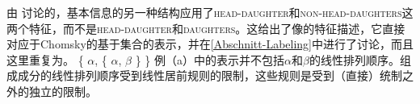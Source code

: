 \noindent
由 \citet[\S~9]{ps2}讨论的，基本信息的另一种结构应用了\textsc{head-daughter}和\textsc{non-head-daughters}这两个特征，而不是\textsc{head-daughter}和\textsc{daughters}。这给出了像的特征描述，它直接对应于Chomsky的基于集合的表示，并在\ref{Abschnitt-Labeling}中进行了讨论，而且这里重复为。
\eal
\ex {}
\ex \{ $\alpha$, \{ $\alpha$, $\beta$ \} \}
\zl
例（a）中的表示并不包括$\alpha$和$\beta$的线性排列顺序。组成成分的线性排列顺序受到线性居前规则的限制，这些规则是受到（直接）统制之外的独立的限制。

